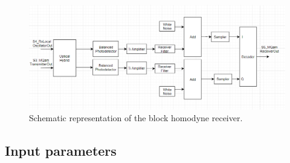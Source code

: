 \begin{figure}[H]
	\centering
	\includegraphics[width=\textwidth]{../lib/m_qam_receiver/figure_PLoureiro/Receiver.png}
	\caption{Schematic representation of the block homodyne
	receiver.}\label{fig:homodyneRx_blocks}
\end{figure}

\subsection*{Input parameters}

